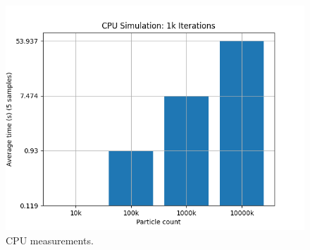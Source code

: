 \documentclass[a4paper, 12pt]{article}
\begin{document}
\begin{figure}
    \centering
	\includegraphics[width=0.8\linewidth]{graphs/ex_3_graph_cpu.png}
	\caption{CPU measurements.}
    \label{fig:ex-3-cpu}
\end{figure}
\end{document}
